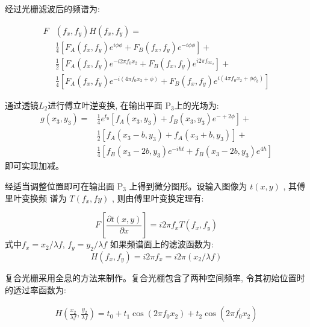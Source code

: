 \documentclass{buaaemp}
\begin{document}
经过光栅滤波后的频谱为: 

\begin{align*}
 F & \left(f_{x},   f_{y}\right) H\left(f_{x}, f_{y}\right)=  \\
& \frac{1}{4}\left[F_{A}\left(f_{x}, f_{y}\right) e^{i \phi \phi}+F_{B}\left(f_{x}, f_{y}\right) e^{-i \phi \phi}\right] + \\
& \frac{1}{2}\left[F_{A}\left(f_{x}, f_{y}\right) e^{-i 2 \pi f_{0} x_{2}}+F_{B}\left(f_{x}, f_{y}\right) e^{i 2 \pi f_{0 x_{2}}}\right]+\\
&  \frac{1}{4}\left[F_{A}\left(f_{x}, f_{y}\right) e^{-i\left(4 \pi f_{0} x_{2}+\phi\right)}+F_{B}\left(f_{x}, f_{y}\right) e^{i\left(4 \pi f_{0} x_{2}+\phi \phi_{b}\right)}\right]
\end{align*}


通过透镜$L_{2}$进行傅立叶逆变换, 在输出平面 $\mathrm{P}_{3}$上的光场为:
\begin{align*}
    g\left(x_{3}, y_{3}\right)=& \frac{1}{4} e^{t_{0}}\left[f_{A}\left(x_{3}, y_{3}\right)+f_{B}\left(x_{3}, y_{3}\right) e^{-+2 \phi}\right]+ \\ &\frac{1}{2}\left[f_{A}\left(x_{3}-b, y_{3}\right)+f_{A}\left(x_{3}+b, y_{3}\right)\right]+\\
&\frac{1}{4}\left[f_{B}\left(x_{3}-2 b, y_{3}\right) e^{-i \hbar t}+f_{B}\left(x_{3}-2 b, y_{3}\right) e^{4 \hbar}\right]
\end{align*}
即可实现加减。

经适当调整位置即可在输出面 $ \mathrm{P}_{3}$  上得到微分图形。设输入图像为 $ t(x, y)$ , 其傅里叶变换频 谱为  $T(f_x, fy)$ , 则由傅里叶变换定理有:


\begin{equation}
    F\left[\frac{\partial t(x, y)}{\partial x}\right]=i 2 \pi f_{x} T\left(f_{x}, f_{y}\right)
\end{equation}
式中$ f_{x}=x_{2} / \lambda f$, $f_{y}=y_{2} / \lambda f$ 
如果频谱面上的滤波函数为: 
\begin{equation}
    H\left(f_{x}, f_{y}\right)=i 2 \pi f_{x}=i 2 \pi\left(x_{2} / \lambda f\right)
\end{equation}

复合光栅采用全息的方法来制作。复合光棚包含了两种空间频率, 令其初始位置时的透过率函数为:

\begin{align*}
    H\left(\frac{x_{2}}{\lambda f}, \frac{y_{2}}{\lambda f}\right) = t_{0}+t_{1} \cos \left(2 \pi f_{0} x_{2}\right)+t_{2} \cos \left(2 \pi f_{0}^{\prime} x_{2}\right)
\end{align*}
\end{document}
